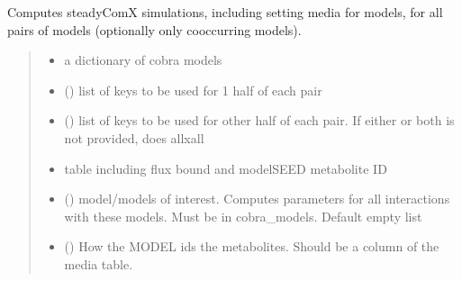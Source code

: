 \documentclass[letterpaper,10pt,english]{sphinxmanual}
\begin{document}
\begin{fulllineitems}
\label{\detokenize{network_build:make_gem_network.cocultures}}
\pysigstartsignatures
{}
\pysigstopsignatures
\sphinxAtStartPar
Computes steadyComX simulations, including setting media for models, for all pairs of models (optionally only co\sphinxhyphen{}occurring models).
\begin{quote}\begin{description}
\begin{itemize}
\item {} 
\sphinxAtStartPar
{} \textendash{} a dictionary of cobra models

\item {} 
\sphinxAtStartPar
{} (\sphinxstyleliteralemphasis{\sphinxupquote{{[}}}\sphinxstyleliteralemphasis{\sphinxupquote{{]}}}) \textendash{} list of keys to be used for 1 half of each pair

\item {} 
\sphinxAtStartPar
{} (\sphinxstyleliteralemphasis{\sphinxupquote{{[}}}\sphinxstyleliteralemphasis{\sphinxupquote{{]}}}) \textendash{} list of keys to be used for other half of each pair. If either or both is not provided, does allxall

\item {} 
\sphinxAtStartPar
{} \textendash{} table including flux bound and modelSEED metabolite ID

\item {} 
\sphinxAtStartPar
{} () \textendash{} model/models of interest. Computes parameters for all interactions with these models. Must be in cobra\_models. Default empty list

\item {} 
\sphinxAtStartPar
{} () \textendash{} How the MODEL ids the metabolites. Should be a column of the media table.


\end{itemize}
\end{description}
\end{quote}
\end{fulllineitems}
\end{document}
